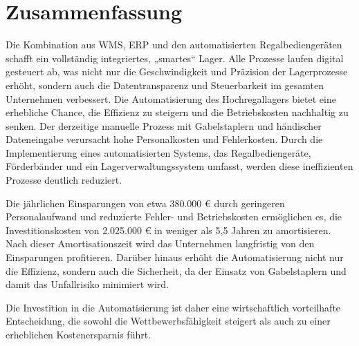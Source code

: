 \chapter{Zusammenfassung}

Die Kombination aus WMS, ERP und den automatisierten Regalbediengeräten schafft ein vollständig integriertes, „smartes“ Lager. Alle Prozesse laufen digital gesteuert ab, was nicht nur die Geschwindigkeit und Präzision der Lagerprozesse erhöht, sondern auch die Datentransparenz und Steuerbarkeit im gesamten Unternehmen verbessert.
Die Automatisierung des Hochregallagers bietet eine erhebliche Chance, die Effizienz zu steigern und die Betriebskosten nachhaltig zu senken. Der derzeitige manuelle Prozess mit Gabelstaplern und händischer Dateneingabe verursacht hohe Personalkosten und Fehlerkosten. Durch die Implementierung eines automatisierten Systems, das Regalbediengeräte, Förderbänder und ein Lagerverwaltungssystem umfasst, werden diese ineffizienten Prozesse deutlich reduziert.

Die jährlichen Einsparungen von etwa 380.000 € durch geringeren Personalaufwand und reduzierte Fehler- und Betriebskosten ermöglichen es, die Investitionskosten von 2.025.000 € in weniger als 5,5 Jahren zu amortisieren. Nach dieser Amortisationszeit wird das Unternehmen langfristig von den Einsparungen profitieren. Darüber hinaus erhöht die Automatisierung nicht nur die Effizienz, sondern auch die Sicherheit, da der Einsatz von Gabelstaplern und damit das Unfallrisiko minimiert wird.

Die Investition in die Automatisierung ist daher eine wirtschaftlich vorteilhafte Entscheidung, die sowohl die Wettbewerbsfähigkeit steigert als auch zu einer erheblichen Kostenersparnis führt.